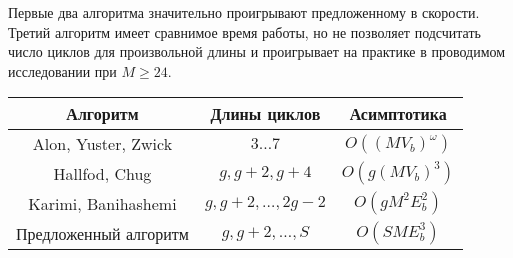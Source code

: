 Первые два алгоритма значительно проигрывают предложенному в скорости. Третий алгоритм имеет сравнимое время работы, 
но не позволяет подсчитать число циклов для произвольной длины и проигрывает на практике в проводимом исследовании при $M \ge 24$.
\begin{center}
	\begin{tabular}{|c|c|c|}
	\hline
	Алгоритм & Длины циклов & Асимптотика\\
	\hline
	Alon, Yuster, Zwick \cite{finding-and-counting-given-length-cycles} &  $3 \ldots 7$ & $O((MV_b)^{\omega})$ \\
	\hline
	Hallfod, Chug \cite{algorithm-for-counting-for-counting-short-cycles-in-bipartite-graphs} &  $g, g+2, g+4$ & $O(g(MV_b)^3)$\\
	\hline
	Karimi, Banihashemi \cite{message-passing-algorithm-for-counting-short-cycles-in-graph} & $g, g+2, \ldots, 2g-2$ & $O(gM^2E_b^2)$ \\
	\hline
	Предложенный алгоритм & $g, g+2, \ldots, S$ & $O(SME_b^3)$ \\
	\hline
\end{tabular}
\end{center}































